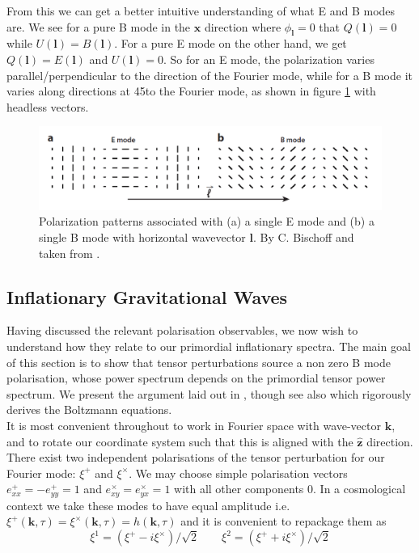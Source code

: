 \documentclass[a4paper,10pt]{article}
\renewcommand{\v}[1]{\mathbf{#1}}
\newcommand{\unit}[1]{\hat{\v{#1}}}
\begin{document}
From this we can get a better intuitive understanding of what E and B modes are. We see for a pure B mode in the $\unit{x}$ direction where $\phi_\v{l} = 0$ that $Q(\v{l})=0$ while $U(\v{l})=B(\v{l})$. For a pure E mode on the other hand, we get  $Q(\v{l})=E(\v{l})$ and $U(\v{l})=0$. So for an E mode, the polarization varies parallel/perpendicular to the direction of the Fourier mode, while for a B mode it varies along directions at 45\textdegree to the Fourier mode, as shown in figure \ref{EBint} with headless vectors.

\begin{figure}[h]
  \includegraphics[width=0.7\linewidth]{EBintuition.png}
  \centering
  \caption{Polarization patterns associated with (a) a single E mode and (b) a single B mode with horizontal wavevector $\v{l}$. By C. Bischoff and taken from \cite{QBM}.}
  \label{EBint}
\end{figure}

\subsection{Inflationary Gravitational Waves}
\label{IGWs}

Having discussed the relevant polarisation observables, we now wish to understand how they relate to our primordial inflationary spectra. The main goal of this section is to show that tensor perturbations source a non zero B mode polarisation, whose power spectrum depends on the primordial tensor power spectrum. We present the argument laid out in \cite{all-sky}, though see also \cite{kowosky} which rigorously derives the Boltzmann equations.\\

It is most convenient throughout to work in Fourier space with wave-vector $\v{k}$, and to rotate our coordinate system such that this is aligned with the $\unit{z}$ direction. There exist two independent polarisations of the tensor perturbation for our Fourier mode: $\xi^+$ and $\xi^\times$. We may choose simple polarisation vectors $e^+_{xx}=-e^+_{yy}=1$ and $e^\times_{xy}=e^\times_{yx}=1$ with all other components 0. In a cosmological context we take these modes to have equal amplitude i.e. $\xi^+(\v{k},\tau)=\xi^\times(\v{k},\tau)=h(\v{k},\tau)$ and it is convenient to repackage them as
\begin{equation}
\xi^1 = (\xi^+ - i\xi^\times)/\sqrt{2} \qquad \xi^2 = (\xi^+ + i\xi^\times)/\sqrt{2}
\end{equation}
\end{document}
